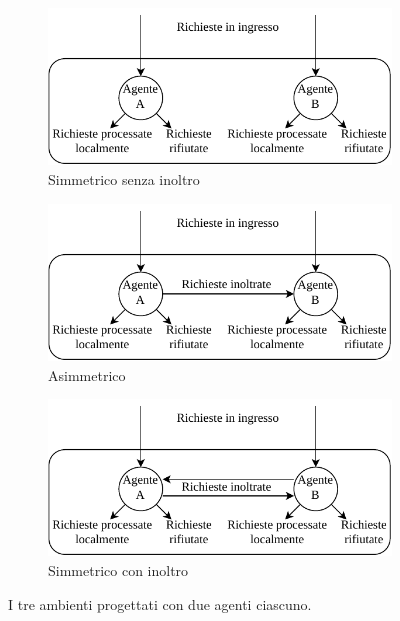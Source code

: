 \begin{figure}
    \centering

    \begin{subfigure}{.6\textwidth}
        \centering
        \includegraphics[width=\linewidth]{assets/4/1_sym_no_fw.pdf}
        \caption{Simmetrico senza inoltro}
    \end{subfigure}

    \begin{subfigure}{.6\textwidth}
        \centering
        \includegraphics[width=\linewidth]{assets/4/2_asym.pdf}
        \caption{Asimmetrico}
    \end{subfigure}

    \begin{subfigure}{.6\textwidth}
        \centering
        \includegraphics[width=\linewidth]{assets/4/3_sym_fw.pdf}
        \caption{Simmetrico con inoltro}
    \end{subfigure}
    
    \caption{I tre ambienti progettati con due agenti ciascuno.}
    \label{fig:4_environments}
\end{figure}

